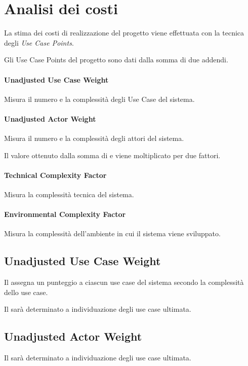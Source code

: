 \section{Analisi dei costi}

La stima dei costi di realizzazione del progetto viene effettuata con la tecnica degli \emph{Use Case Points}.

Gli Use Case Points del progetto sono dati dalla somma di due addendi.

\paragraph{Unadjusted Use Case Weight}
	Misura il numero e la complessit\`a degli Use Case del sistema.

\paragraph{Unadjusted Actor Weight}
	Misura il numero e la complessit\`a degli attori del sistema.

Il valore ottenuto dalla somma di  e  viene moltiplicato per due fattori.

\paragraph{Technical Complexity Factor}
	Misura la complessit\`a tecnica del sistema.

\paragraph{Environmental Complexity Factor}
	Misura la complessit\`a dell'ambiente in cui il sistema viene sviluppato.

\subsection{Unadjusted Use Case Weight}

Il  assegna un punteggio a ciascun use case del sistema secondo la complessit\`a dello use case.

Il  sar\`a determinato a individuazione degli use case ultimata.

\subsection{Unadjusted Actor Weight}

Il  sar\`a determinato a individuazione degli use case ultimata.

